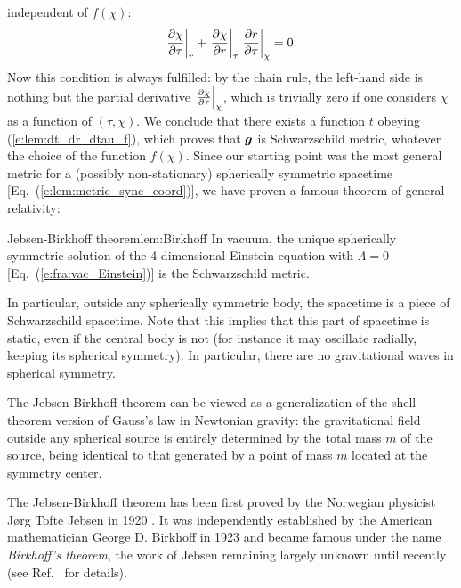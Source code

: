 independent of $f(\chi)$:
\[
    \left. \frac{\partial \chi}{\partial \tau} \right| _r  +
    \left. \frac{\partial \chi}{\partial r} \right| _\tau \left. \frac{\partial r}{\partial \tau} \right| _\chi = 0 .
\]
Now this condition is always fulfilled:
by the chain rule, the left-hand side is nothing but the partial derivative
$\left. \frac{\partial \chi}{\partial \tau} \right| _\chi$, which is trivially zero
if one considers $\chi$ as a function of $(\tau,\chi)$.
We conclude that there exists a function $t$ obeying
(\ref{e:lem:dt_dr_dtau_f}), which proves that $\bm{g}$ is
Schwarzschild metric, whatever the choice of the function $f(\chi)$.
Since our starting point was
the most general metric for a (possibly non-stationary) spherically symmetric spacetime
[Eq.~(\ref{e:lem:metric_sync_coord})], we have proven
a famous theorem of general relativity:

\begin{tprop}{Jebsen-Birkhoff theorem}{lem:Birkhoff}
In vacuum, the unique spherically symmetric solution of the 4-dimensional
Einstein equation with $\Lambda=0$ [Eq.~(\ref{e:fra:vac_Einstein})]
is the Schwarzschild metric.
\end{tprop}

In particular, outside any spherically symmetric body, the spacetime
is a piece of Schwarz\-schild spacetime. Note that this implies that this part of
spacetime is static, even if the central body is not (for instance it may oscillate
radially, keeping its spherical symmetry). In particular, there are no
gravitational waves in spherical symmetry.
\begin{remark}
The Jebsen-Birkhoff theorem can be viewed as a generalization of the shell theorem version
of Gauss's law in Newtonian gravity:
the gravitational field outside any spherical source is entirely determined by the total
mass $m$ of the source, being identical to that generated by a point of mass $m$
located at the symmetry center.
\end{remark}

\begin{hist}
The Jebsen-Birkhoff theorem has been first proved by the Norwegian physicist
Jørg Tofte Jebsen in 1920 \cite{Jebse1921}. It was independently established by the American mathematician George D. Birkhoff in 1923 \cite{Birkh1923} and became famous under the
name \emph{Birkhoff's theorem}, the work of Jebsen remaining largely unknown until recently (see Ref.~\cite{JohanR06} for details).
\end{hist}

